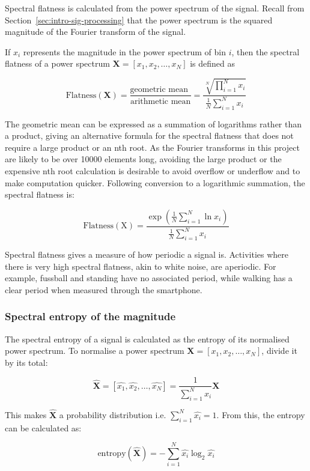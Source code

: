         Spectral flatness is calculated from the power spectrum of the signal. Recall from Section~\ref{sec:intro-sig-processing} that the power spectrum is the squared magnitude of the Fourier transform of the signal.
        
        If $x_i$ represents the magnitude in the power spectrum of bin $i$, then the spectral flatness of a power spectrum $\mathbf{X} = [x_1, x_2, \dots , x_N]$ is defined as
        
        $$\mathrm{Flatness(\mathbf{X})} = \frac{\text{geometric mean }}{\text{arithmetic mean}} = \frac{\sqrt[N]{\prod\limits_{i=1}^N x_i}}{\frac{1}{N}\sum_{i=1}^N x_i}$$
        
        The geometric mean can be expressed as a summation of logarithms rather than a product, giving an alternative formula for the spectral flatness that does not require a large product or an nth root. As the Fourier transforms in this project are likely to be over 10000 elements long, avoiding the large product or the expensive nth root calculation is desirable to avoid overflow or underflow and to make computation quicker. Following conversion to a logarithmic summation, the spectral flatness is:
        
        $$\mathrm{Flatness(X)} = \frac{\exp \left( \frac{1}{N}\sum\limits_{i=1}^N \ln x_i \right) }{\frac{1}{N}\sum_{i=1}^N x_i}$$
        
        Spectral flatness gives a measure of how periodic a signal is. Activities where there is very high spectral flatness, akin to white noise, are aperiodic. For example, fussball and standing have no associated period, while walking has a clear period when measured through the smartphone.
      \subsubsection{Spectral entropy of the magnitude}
        The spectral entropy of a signal is calculated as the entropy of its normalised power spectrum. To normalise a power spectrum $\mathbf{X} = [x_1, x_2, \dots , x_N]$, divide it by its total:
        
        $$\hat{\mathbf{X}} = [\hat{x_1}, \hat{x_2}, \dots , \hat{x_N}] = \frac{1}{\sum_{i=1}^N x_i} \mathbf{X}$$
        
        This makes $\hat{\mathbf{X}}$ a probability distribution i.e. $\sum_{i=1}^N \hat{x_i} = 1$.
        From this, the entropy can be calculated as:
        
        $$\mathrm{entropy}(\mathbf{\hat{X}}) = -\sum\limits_{i=1}^N \hat{x_i} \log_2 \hat{x_i}$$
        
